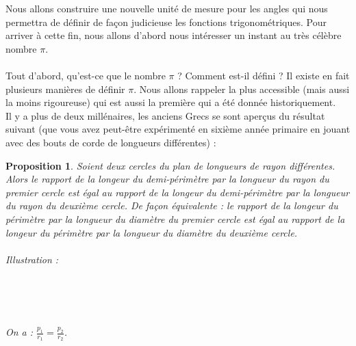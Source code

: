 \documentclass[a4paper,fontsize=13pt]{scrreprt}
\theoremstyle{plain}
\newtheorem{pro}[subsection]{Proposition}
\theoremstyle{definition}
\begin{document}
Nous allons construire une nouvelle unité de mesure pour les angles qui nous permettra de définir de façon judicieuse les fonctions trigonométriques. Pour arriver à cette fin, nous allons d'abord nous intéresser un instant au très célèbre nombre $\pi$. \\~\\
Tout d'abord, qu'est-ce que le nombre $\pi$ ? Comment est-il défini ? Il existe en fait plusieurs manières de définir $\pi$. Nous allons rappeler la plus accessible (mais aussi la moins rigoureuse) qui est aussi la première qui a été donnée historiquement. \\
Il y a plus de deux millénaires, les anciens Grecs se sont aperçus du résultat suivant (que vous avez peut-être expérimenté en sixième année primaire en jouant avec des bouts de corde de longueurs différentes) :
\begin{pro}\label{rappi}
Soient deux cercles du plan de longueurs de rayon différentes. Alors le rapport de la longeur du demi-périmètre par la longueur du rayon du premier cercle est égal au rapport de la longeur du demi-périmètre par la longueur du rayon du deuxième cercle. De façon équivalente : le rapport de la longeur du périmètre par la longueur du diamètre du premier cercle est égal au rapport de la longeur du périmètre par la longueur du diamètre du deuxième cercle.\\
~\\
Illustration :
\begin{itemize}
\begin{multicols}{2}
		\item []~\\ \begin{center}
~\\~\\On a : $\frac{p_1}{r_1} = \frac{p_2}{r_2}$.
\end{center}

		\item []~\\\begin{center}
\end{center}
	\end{multicols}
\end{itemize}
\end{pro}
\end{document}
